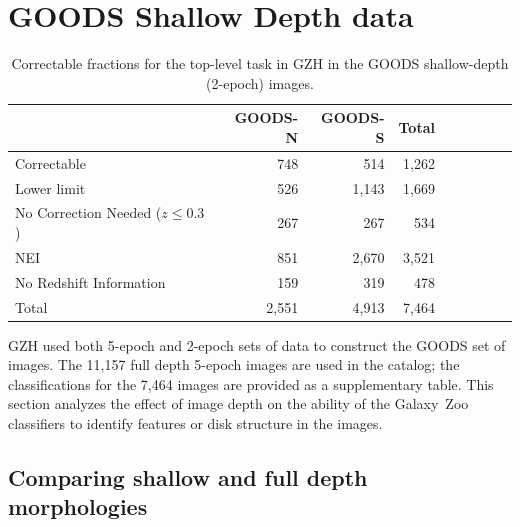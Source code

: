 \documentclass[twocolumn]{aastex6}
\begin{document}


\newpage
\clearpage

\appendix

\section{GOODS Shallow Depth data}


\begin{table}
\caption{Correctable fractions for the top-level task in GZH in the GOODS shallow-depth (2-epoch) images. \label{tbl:goods_shallow_categories}}
\begin{tabular}{lrrrrrrrr}
\hline\hline
                                   & GOODS-N & GOODS-S & Total \\
\hline
Correctable                        & 748     & 514     & 1,262 \\
Lower limit                        & 526     & 1,143   & 1,669 \\
No Correction Needed ($z \le 0.3$) & 267     & 267     & 534   \\ 
NEI                                & 851     & 2,670   & 3,521 \\
No Redshift Information            & 159     & 319     & 478   \\
Total                              & 2,551   & 4,913   & 7,464 \\
\hline\hline
\end{tabular}
\end{table}

GZH used both 5-epoch and 2-epoch sets of data to construct the GOODS set of
images. The 11,157 full depth 5-epoch images are used in the \main{} catalog; the
classifications for the 7,464 \goods{} images are provided as a
supplementary table. This section analyzes the effect of image depth on the
ability of the Galaxy~Zoo classifiers to identify features or disk structure in the images. 

\subsection{Comparing shallow and full depth morphologies}
\end{document}

